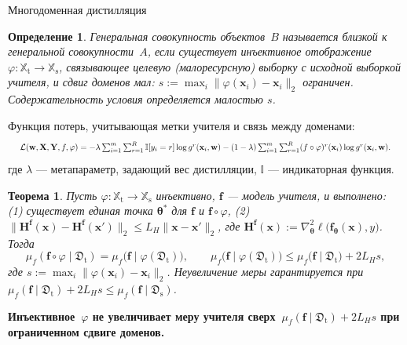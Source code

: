 \documentclass[9pt,pdf,hyperref={unicode}]{beamer}
\newtheorem{rustheorem}{Теорема}
\newtheorem{rusdefinition}{Определение}
\newcommand{\key}[1]{\par\vspace{0.5ex}\noindent\textbf{\color{darkgreen}#1}}
\begin{document}
\begin{frame}[t]{Многодоменная дистилляция}
\justifying
\small
\begin{rusdefinition}
    Генеральная совокупность объектов~$B$ называется близкой к генеральной совокупности~$A$, если существует инъективное отображение~$\varphi:\mathbb{X}_{\mathrm{t}}\to\mathbb{X}_{\mathrm{s}}$, связывающее целевую (малоресурсную) выборку с исходной выборкой учителя, и сдвиг доменов мал: $s:=\max_i\|\varphi(\mathbf{x}_i)-\mathbf{x}_i\|_2$ ограничен. Содержательность условия определяется малостью $s$.
\end{rusdefinition}
Функция потерь, учитывающая метки учителя и связь между доменами:
\[
    \resizebox{0.98\textwidth}{!}{$\textstyle\mathcal{L}(\mathbf{w},\mathbf{X},\mathbf{Y},f,\varphi)=-\lambda\sum_{i=1}^{m}\sum_{r=1}^{R}\mathbb{I}[y_i=r]\log g^{r}(\mathbf{x}_i,\mathbf{w})-(1-\lambda)\sum_{i=1}^{m}\sum_{r=1}^{R}(f\circ\varphi)^{r}(\mathbf{x}_i)\log g^{r}(\mathbf{x}_i,\mathbf{w}).$}
\]
где $\lambda$ --- метапараметр, задающий вес дистилляции, $\mathbb{I}$ --- индикаторная функция.
\begin{rustheorem}
    Пусть $\varphi:\mathbb{X}_{\mathrm{t}}\to\mathbb{X}_{\mathrm{s}}$ инъективно, $\mathbf{f}$ --- модель учителя, и выполнено: (1) существует единая точка $\boldsymbol{\theta}^*$ для $\mathbf{f}$ и $\mathbf{f}\circ\varphi$, (2) $\|\mathbf{H}^{\mathbf{f}}(\mathbf{x})-\mathbf{H}^{\mathbf{f}}(\mathbf{x}')\|_2\le L_H\|\mathbf{x}-\mathbf{x}'\|_2$, где $\mathbf{H}^{\mathbf{f}}(\mathbf{x}):=\nabla^2_{\boldsymbol{\theta}}\ell\bigl(\mathbf{f}_{\boldsymbol{\theta}}(\mathbf{x}),y\bigr)$. Тогда
    \[
        \mu_f(\mathbf{f}\circ\varphi\mid\mathfrak{D}_{\mathrm{t}})=\mu_f\bigl(\mathbf{f}\mid\varphi(\mathfrak{D}_{\mathrm{t}})\bigr),\qquad
        \mu_f\bigl(\mathbf{f}\mid\varphi(\mathfrak{D}_{\mathrm{t}})\bigr)\le\mu_f\bigl(\mathbf{f}\mid\mathfrak{D}_{\mathrm{t}}\bigr)+2L_H s,
    \]
    где $s:=\max_i\|\varphi(\mathbf{x}_i)-\mathbf{x}_i\|_2$. Неувеличение меры гарантируется при $\mu_f(\mathbf{f}\mid\mathfrak{D}_{\mathrm{t}})+2L_Hs\le\mu_f(\mathbf{f}\mid\mathfrak{D}_{\mathrm{s}})$.
\end{rustheorem}
\key{Инъективное~$\varphi$ не увеличивает меру учителя сверх~$\mu_f(\mathbf{f}\mid\mathfrak{D}_{\mathrm{t}})+2L_H s$ при ограниченном сдвиге доменов.}
\end{frame}
\end{document}
